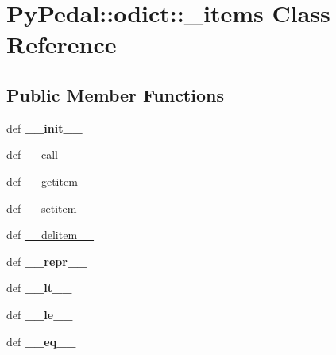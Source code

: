 \hypertarget{classPyPedal_1_1odict_1_1__items}{
\section{PyPedal::odict::\_\-items Class Reference}
\label{classPyPedal_1_1odict_1_1__items}
}
\subsection*{Public Member Functions}
\begin{CompactItemize}
\item 
\hypertarget{classPyPedal_1_1odict_1_1__items_a348680186ff7495f24856d08217aa0e}{
def \textbf{\_\-\_\-init\_\-\_\-}}
\label{classPyPedal_1_1odict_1_1__items_a348680186ff7495f24856d08217aa0e}

\item 
def \hyperlink{classPyPedal_1_1odict_1_1__items_f8095a2e3f5a69db579fcd11df3fc27a}{\_\-\_\-call\_\-\_\-}
\item 
def \hyperlink{classPyPedal_1_1odict_1_1__items_977705db2930720c52a3f18ad85e9330}{\_\-\_\-getitem\_\-\_\-}
\item 
def \hyperlink{classPyPedal_1_1odict_1_1__items_2987b5918090993adde62951347b50c6}{\_\-\_\-setitem\_\-\_\-}
\item 
def \hyperlink{classPyPedal_1_1odict_1_1__items_a3111dd6a1c593d0f57ecdee72316d3e}{\_\-\_\-delitem\_\-\_\-}
\item 
\hypertarget{classPyPedal_1_1odict_1_1__items_5fbd61053211afc229cdf5da2839894e}{
def \textbf{\_\-\_\-repr\_\-\_\-}}
\label{classPyPedal_1_1odict_1_1__items_5fbd61053211afc229cdf5da2839894e}

\item 
\hypertarget{classPyPedal_1_1odict_1_1__items_02cb35a35a45d1a880db27c34922e2b4}{
def \textbf{\_\-\_\-lt\_\-\_\-}}
\label{classPyPedal_1_1odict_1_1__items_02cb35a35a45d1a880db27c34922e2b4}

\item 
\hypertarget{classPyPedal_1_1odict_1_1__items_e18310d4a7744b47c55876e30acd92e4}{
def \textbf{\_\-\_\-le\_\-\_\-}}
\label{classPyPedal_1_1odict_1_1__items_e18310d4a7744b47c55876e30acd92e4}

\item 
\hypertarget{classPyPedal_1_1odict_1_1__items_4cbc68f38bfce15a37b08a9242f303af}{
def \textbf{\_\-\_\-eq\_\-\_\-}}
\label{classPyPedal_1_1odict_1_1__items_4cbc68f38bfce15a37b08a9242f303af}


\end{CompactItemize}

